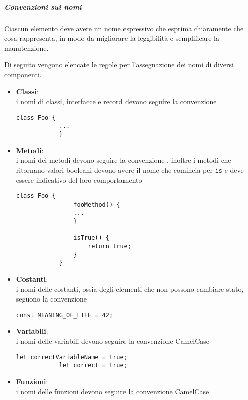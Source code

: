 \subparagraph{Convenzioni sui nomi}

Ciascun elemento deve avere un nome espressivo che esprima chiaramente che cosa rappresenta, in modo da migliorare la leggibilità e
semplificare la manutenzione.

Di seguito vengono elencate le regole per l'assegnazione dei nomi di diversi componenti.
\begin{itemize}
	\item \textbf{Classi}:\\
		i nomi di classi, interfacce e record devono seguire la convenzione  \\
        \begin{lstlisting}[style=htmlcssjs]
			class Foo {
			...
			}
		\end{lstlisting}

    \item \textbf{Metodi}:\\
    	i nomi dei metodi devono seguire la convenzione , inoltre i metodi che ritornano valori booleani devono avere il
    	nome che comincia per \texttt{is} e deve essere indicativo del loro comportamento\\
		\begin{lstlisting}[style=htmlcssjs]
			class Foo {
				fooMethod() {
				...
				}

				isTrue() {
					return true;
				}
			}
		\end{lstlisting}

	\item \textbf{Costanti}:\\
		i nomi delle costanti, ossia degli elementi che non possono cambiare stato, seguono la convenzione
		 \\
		\begin{lstlisting}[style=htmlcssjs]
			const MEANING_OF_LIFE = 42;
		\end{lstlisting}

    \item \textbf{Variabili}:\\
		i nomi delle variabili devono seguire la convenzione CamelCase \\
		\begin{lstlisting}[style=htmlcssjs]
			let correctVariableName = true;
			let correct = true;
		\end{lstlisting}

	\item \textbf{Funzioni}:\\
		i nomi delle funzioni devono seguire la convenzione CamelCase \\


\end{itemize}
